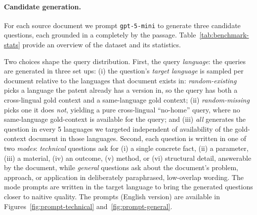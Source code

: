 \paragraph{Candidate generation.}
For each source document we prompt \texttt{gpt-5-mini} to generate three
candidate questions, each grounded in a completely by the passage. Table~\ref{tab:benchmark-stats} provide an overview of the dataset and its statistics. 

Two choices shape the query distribution. First, the query \emph{language}: the queries are generated in three set ups: (i) the question's
\emph{target language} is sampled per document relative to the languages that
document exists in: \emph{random-existing} picks a language the patent already
has a version in, so the query has both a cross-lingual gold context and a same-language gold context; (ii)
\emph{random-missing} picks one it does \emph{not}, yielding a pure cross-lingual
``no-home'' query, where no same-language gold-context is available for the query; and (iii) \emph{all} generates the question in every 5 languages
we targeted independent of availability of the gold-context document in those languages. Second, each question is written in one of two \emph{modes}:
\emph{technical} questions ask for (i) a single concrete fact, (ii) a parameter, (iii) a
material, (iv) an outcome, (v) method, or (vi) structural detail, answerable by the document, while \emph{general} questions ask about the document's problem, approach,
or application in deliberately paraphrased, low-overlap wording. The mode prompts
are written in the target language to bring the generated questions closer to naitive quality. The prompts (English version) are available in  Figures~\ref{fig:prompt-technical}
and~\ref{fig:prompt-general}.

